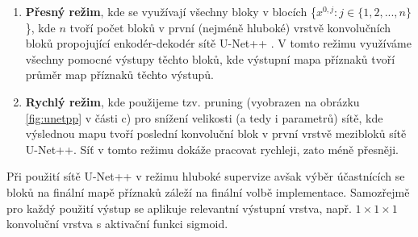 \begin{enumerate}
    \item \textbf{Přesný režim}, kde se využívají všechny bloky v blocích \{\(x^{0, j} \colon j \in \{1,2,...,n\}\)\}, kde \(n\) tvoří počet bloků v první (nejméně hluboké) vrstvě konvolučních bloků propojující enkodér-dekodér sítě U-Net++ \cite{unetpp}. V tomto režimu využíváme všechny pomocné výstupy těchto bloků, kde výstupní mapa příznaků tvoří průměr map příznaků těchto výstupů.
    \item \textbf{Rychlý režim}, kde použijeme tzv. pruning (vyobrazen na obrázku \ref{fig:unetpp} v části c) pro snížení velikosti (a tedy i parametrů) sítě, kde výslednou mapu tvoří poslední konvoluční blok v první vrstvě mezibloků sítě U-Net++. Síť v tomto režimu dokáže pracovat rychleji, zato méně přesněji.
\end{enumerate}

Při použití sítě U-Net++ v režimu hluboké supervize avšak výběr účastnících se bloků na finální mapě příznaků záleží na finální volbě implementace. Samozřejmě pro každý použití výstup se aplikuje relevantní výstupní vrstva, např. $1\times1\times1$ konvoluční vrstva s aktivační funkci sigmoid.

\endinput